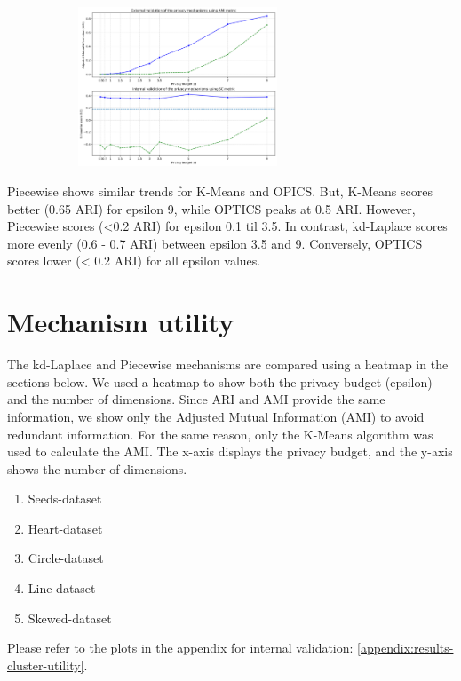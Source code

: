 \begin{figure}[H]
\begin{subfigure}{1\textwidth}
        \includegraphics[width=0.65\textwidth]{Results/kd-laplace/piecewise/heart-dataset/ami-and-sc_10_dimensions.png}
    \end{subfigure}
    \label{fig:validation-heart-dataset_comparison_nd-laplace}
\end{figure}

Piecewise shows similar trends for K-Means and OPICS. But, K-Means scores better (0.65 ARI) for epsilon 9, while OPTICS peaks at 0.5 ARI.
However, Piecewise scores (<0.2 ARI) for epsilon 0.1 til 3.5.
In contrast, kd-Laplace scores more evenly (0.6 - 0.7 ARI) between epsilon 3.5 and 9. Conversely, OPTICS scores lower (< 0.2 ARI) for all epsilon values.
\newpage
\section{Mechanism utility}
The kd-Laplace and Piecewise mechanisms are compared using a heatmap in the sections below.
We used a heatmap to show both the privacy budget (epsilon) and the number of dimensions.
Since ARI and AMI provide the same information, we show only the Adjusted Mutual Information (AMI) to avoid redundant information.
For the same reason, only the K-Means algorithm was used to calculate the AMI.
The x-axis displays the privacy budget, and the y-axis shows the number of dimensions.
\begin{enumerate}
    \item Seeds-dataset
    \item Heart-dataset
    \item Circle-dataset
    \item Line-dataset
    \item Skewed-dataset
\end{enumerate}
Please refer to the plots in the appendix for internal validation: \ref{appendix:results-cluster-utility}.
\newpage

